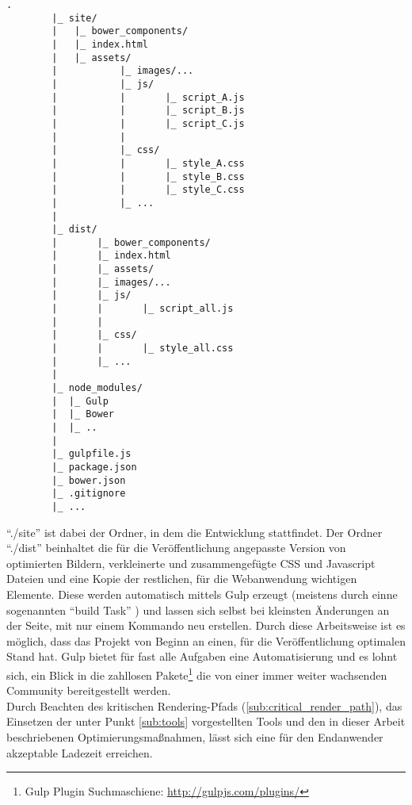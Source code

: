 		\begin{lstlisting}[captionpos=b, caption=Projektstruktur, label=lst:projectTree]
		.
		|_ site/
		|	|_ bower_components/
		|	|_ index.html
		|	|_ assets/
		|			|_ images/...
		|			|_ js/
		|			|		|_ script_A.js
		|			|		|_ script_B.js
		|			|		|_ script_C.js
		|			|
		|			|_ css/
		|			|		|_ style_A.css
		|			|		|_ style_B.css
		|			|		|_ style_C.css
		|			|_ ...
		|
		|_ dist/
		|		|_ bower_components/
		|		|_ index.html
		|		|_ assets/
		|		|_ images/...
		|		|_ js/
		|		|		|_ script_all.js
		|		|
		|		|_ css/
		|		|		|_ style_all.css
		|		|_ ...
		|
		|_ node_modules/
		|  |_ Gulp
		|  |_ Bower
		|  |_ ..
		|
		|_ gulpfile.js
		|_ package.json
		|_ bower.json
		|_ .gitignore
		|_ ...
		\end{lstlisting}

		"`./site"' ist dabei der Ordner, in dem die Entwicklung stattfindet. Der Ordner "`./dist"' beinhaltet die für die Veröffentlichung angepasste Version von optimierten Bildern, verkleinerte und zusammengefügte CSS und Javascript Dateien und eine Kopie der restlichen, für die Webanwendung wichtigen Elemente. Diese werden automatisch mittels Gulp erzeugt (meistens durch einne sogenannten "`build Task"' ) und lassen sich selbst bei kleinsten Änderungen an der Seite, mit nur einem Kommando neu erstellen. Durch diese Arbeitsweise ist es möglich, dass das Projekt von Beginn an einen, für die Veröffentlichung optimalen Stand hat. Gulp bietet für fast alle Aufgaben eine Automatisierung und es lohnt sich, ein Blick in die zahllosen Pakete\footnote{Gulp Plugin Suchmaschiene: \url{http://gulpjs.com/plugins/}} die von einer immer weiter wachsenden Community bereitgestellt werden.\\
		Durch Beachten des kritischen Rendering-Pfads (\ref{sub:critical_render_path}), das Einsetzen der unter Punkt \ref{sub:tools} vorgestellten Tools und den in dieser Arbeit beschriebenen Optimierungsmaßnahmen, lässt sich eine für den Endanwender akzeptable Ladezeit erreichen.


\pagebreak